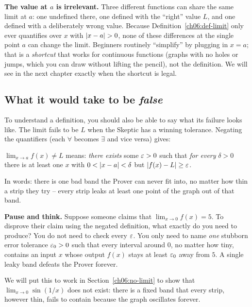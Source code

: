 \begin{trapbox}
\textbf{The value at $a$ is irrelevant.} Three different
functions can share the same limit at $a$: one undefined there, one defined with
the ``right'' value $L$, and one defined with a deliberately wrong value. Because
Definition~\ref{ch06:def-limit} only ever quantifies over $x$ with
$\lvert x-a\rvert>0$, none of these differences at the single point $a$ can change the
limit. Beginners routinely ``simplify'' by plugging in $x=a$; that is a
\emph{shortcut} that works for continuous functions (graphs with no holes or
jumps, which you can draw without lifting the pencil), not the definition. We will see in the next chapter exactly when the shortcut is legal.
\end{trapbox}

\subsection{What it would take to be \emph{false}}

To understand a definition, you should also be able to say what its failure
looks like. The limit fails to be $L$ when the Skeptic has a winning tolerance. Negating the
quantifiers (each $\forall$ becomes $\exists$ and vice versa) gives:

\begin{focusbox}
$\displaystyle \lim_{x\to a} f(x) \ne L$ means: \emph{there exists} some
$\varepsilon > 0$ such that \emph{for every} $\delta > 0$ there is at least one $x$ with
$0 < \lvert x-a\rvert < \delta$ but $\lvert f(x)-L\rvert \ge \varepsilon$.

In words: there is one bad band the Prover can never fit into, no matter how
thin a strip they try -- every strip leaks at least one point of the graph out
of that band.
\end{focusbox}

\begin{recoverybox}
\textbf{Pause and think.} Suppose someone claims that $\lim_{x\to 0} f(x) = 5$.
To disprove their claim using the negated definition, what exactly do you need
to produce? You do not need to check every $\varepsilon$. You only need to name
\emph{one} stubborn error tolerance $\varepsilon_0 > 0$ such that every interval around
$0$, no matter how tiny, contains an input $x$ whose output $f(x)$ stays at
least $\varepsilon_0$ away from $5$. A single leaky band defeats the Prover forever.
\end{recoverybox}

We will put this to work in Section~\ref{ch06:no-limit} to show that
$\lim_{x\to 0}\sin(1/x)$ does not exist: there is a fixed band that every strip,
however thin, fails to contain because the graph oscillates forever.

